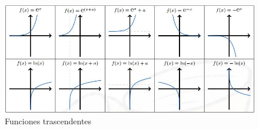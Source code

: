 \documentclass[10pt,twoside]{SelfArx} %
\begin{document}
	

	\begin{figure}[h]
	\centering
	\includegraphics[width=15cm]{funciones_4}
	\caption{Funciones trascendentes}
	\label{Funciones_trascendentes}
	\end{figure}
	
	
	
	
	\newpage
%
%
%
%
\newpage



\end{document}
